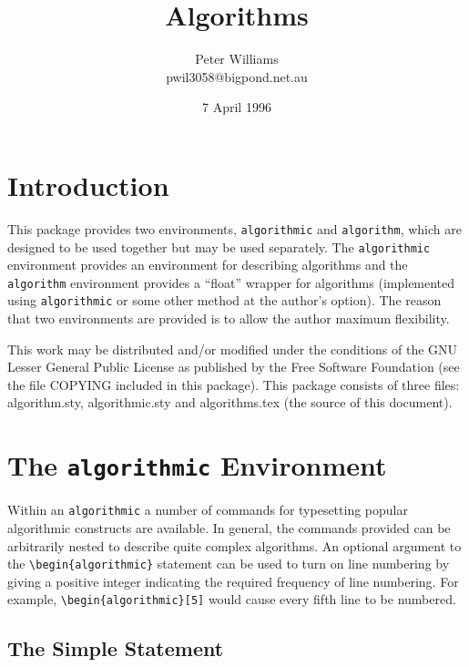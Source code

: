\documentclass{article}
\title{Algorithms}
\author{Peter Williams \\ pwil3058@bigpond.net.au}
\date{7 April 1996}
\newcommand{\keyword}[1]{\texttt{#1}}
\begin{document}
\maketitle
\tableofcontents
\listofalgorithms

\section{Introduction}

This package provides two environments, \keyword{algorithmic} and
\keyword{algorithm}, which are designed to be used together but may be used
separately.
The \keyword{algorithmic} environment provides an environment for describing
algorithms and the \keyword{algorithm} environment provides a ``float''
wrapper for algorithms (implemented using \keyword{algorithmic} or some
other method at the author's option).
The reason that two environments are provided is to allow the author
maximum flexibility.

This work may be distributed and/or modified under the conditions of the GNU
Lesser General Public License as published by the Free Software Foundation (see
the file COPYING included in this package).  This package consists of three
files: algorithm.sty, algorithmic.sty and algorithms.tex (the source of this
document).

\section{The \keyword{algorithmic} Environment}

Within an \keyword{algorithmic} a number of commands for typesetting
popular algorithmic constructs are available.
In general, the commands provided can be arbitrarily nested to
describe quite complex algorithms.
An optional argument to the \verb+\begin{algorithmic}+ statement can be
used to turn on line numbering by giving a positive integer indicating the
required frequency of line numbering.
For example, \verb+\begin{algorithmic}[5]+ would cause every fifth line to
be numbered.

\subsection{The Simple Statement}
\end{document}
